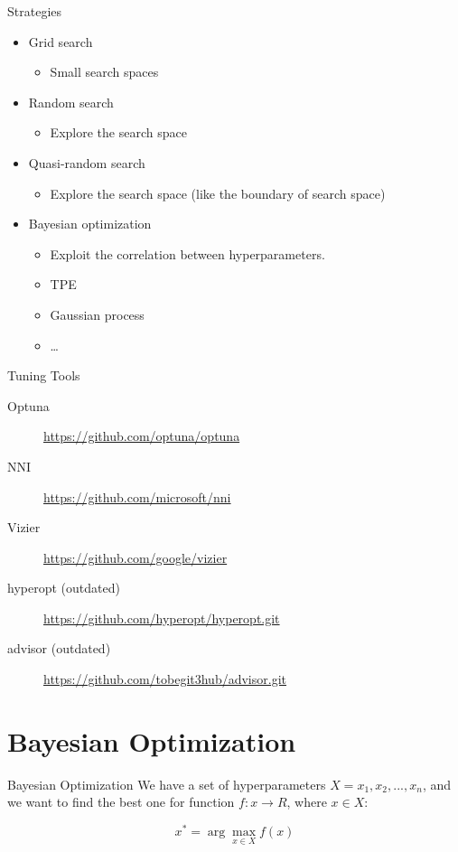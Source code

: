 \documentclass[aspectratio=1610,xcolor={dvipsnames},hyperref={colorlinks,unicode,linkcolor=violet,anchorcolor=BlueViolet,citecolor=YellowOrange,filecolor=black,urlcolor=Aquamarine}]{beamer}
\begin{document}
\begin{frame}[label={sec:orgbca7d5e}]{Strategies}
\begin{itemize}
\item Grid search
\begin{itemize}
\item Small search spaces
\end{itemize}
\item Random search
\begin{itemize}
\item Explore the search space
\end{itemize}
\item Quasi-random search
\begin{itemize}
\item Explore the search space (like the boundary of search space)
\end{itemize}
\item Bayesian optimization
\begin{itemize}
\item Exploit the correlation between hyperparameters.
\item TPE
\item Gaussian process
\item \ldots{}
\end{itemize}
\end{itemize}
\end{frame}

\begin{frame}[label={sec:orgcac1dc7}]{Tuning Tools}
\begin{description}
\item[{Optuna}] \url{https://github.com/optuna/optuna}
\item[{NNI}] \url{https://github.com/microsoft/nni}
\item[{Vizier}] \url{https://github.com/google/vizier}
\item[{hyperopt (outdated)}] \url{https://github.com/hyperopt/hyperopt.git}
\item[{advisor (outdated)}] \url{https://github.com/tobegit3hub/advisor.git}
\end{description}
\end{frame}

\section{Bayesian Optimization}
\label{sec:orge41e0f7}

\begin{frame}[label={sec:org60f90c2}]{Bayesian Optimization}
We have a set of hyperparameters \(X=x_{1}, x_{2},...,x_{n}\), and we want to find the best one for function \(f: x \rightarrow R\), where \(x \in X\):

\[x^* = \arg \max_{x \in X} f(x)\]
\end{frame}
\end{document}
